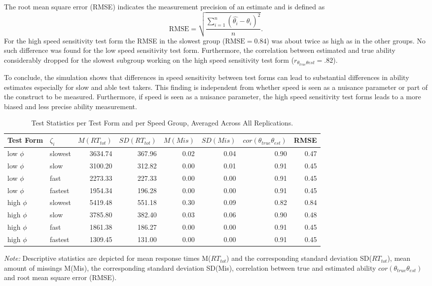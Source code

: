 \documentclass[a4paper,man,apacite,donotrepeattitle]{apa6}
\begin{document}
The root mean square error (RMSE) indicates the measurement precision of an estimate and is defined as 
\begin{equation}
	\textrm{RMSE} = \sqrt{\frac{\sum_{i = 1}^{n} (\widehat{\theta_i} - \theta_i)^2}{n}}.
\end{equation}
For the high speed sensitivity test form the RMSE in the slowest group ($\textrm{RMSE} = 0.84$) was about twice as high as in the other groups. No such difference was found for the low speed sensitivity test form. Furthermore, the correlation between estimated and true ability considerably dropped for the slowest subgroup working on the high speed sensitivity test form ($r_{\theta_{true} \theta{est}} = .82$).

To conclude, the simulation shows that differences in speed sensitivity between test forms can lead to substantial differences in ability estimates especially for slow and able test takers. This finding is independent from whether speed is seen as a nuisance parameter or part of the construct to be measured. Furthermore, if speed is seen as a nuisance parameter, the high speed sensitivity test forms leads to a more biased and less precise ability measurement. 
 
\begin{table}[ht]
\centering
\caption{Test Statistics per Test Form and per Speed Group, Averaged Across All Replications.} 
\begin{tabular}{llrrrrrr}
  \hline
Test Form & $\zeta_{i}$ & $M(RT_{tot})$ & $SD(RT_{tot})$ & $M(Mis)$ & $SD(Mis)$ & $cor(\theta_{true} \theta_{est})$ & RMSE \\ 
  \hline
low $\phi$ & slowest & 3634.74 & 367.96 & 0.02 & 0.04 & 0.90 & 0.47 \\ 
  low $\phi$ & slow & 3100.20 & 312.82 & 0.00 & 0.01 & 0.91 & 0.45 \\ 
  low $\phi$ & fast & 2273.33 & 227.33 & 0.00 & 0.00 & 0.91 & 0.45 \\ 
  low $\phi$ & fastest & 1954.34 & 196.28 & 0.00 & 0.00 & 0.91 & 0.45 \\ 
  high $\phi$ & slowest & 5419.48 & 551.18 & 0.30 & 0.09 & 0.82 & 0.84 \\ 
  high $\phi$ & slow & 3785.80 & 382.40 & 0.03 & 0.06 & 0.90 & 0.48 \\ 
  high $\phi$ & fast & 1861.38 & 186.27 & 0.00 & 0.00 & 0.91 & 0.45 \\ 
  high $\phi$ & fastest & 1309.45 & 131.00 & 0.00 & 0.00 & 0.91 & 0.45 \\ 
   \hline
\end{tabular}
\begin{tablenotes}
\vspace{0.1cm}
\small
    \textit{Note:} Descriptive statistics are depicted for mean response times M($RT_{tot}$) and the corresponding standard deviation SD($RT_{tot}$), mean amount of missings M(Mis), the corresponding standard deviation SD(Mis), correlation between true and estimated ability $cor(\theta_{true} \theta_{est})$ and root mean square error (RMSE). 
\end{tablenotes}
\label{tab:descr}
\end{table}
\end{document}
